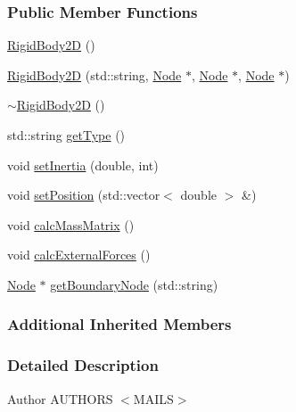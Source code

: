 \subsubsection*{Public Member Functions}
\begin{DoxyCompactItemize}
\item 
\hyperlink{classmknix_1_1_rigid_body2_d_a4689e5f861400337980478a2d8845834}{Rigid\-Body2\-D} ()
\item 
\hyperlink{classmknix_1_1_rigid_body2_d_ae8506521fc62c80097857eccaffaa1db}{Rigid\-Body2\-D} (std\-::string, \hyperlink{classmknix_1_1_node}{Node} $\ast$, \hyperlink{classmknix_1_1_node}{Node} $\ast$, \hyperlink{classmknix_1_1_node}{Node} $\ast$)
\item 
\hyperlink{classmknix_1_1_rigid_body2_d_a38d39e70ab2af08776a426fec5dc8f36}{$\sim$\-Rigid\-Body2\-D} ()
\item 
std\-::string \hyperlink{classmknix_1_1_rigid_body2_d_a36d7142c5123c4055c019109fb6169dc}{get\-Type} ()
\item 
void \hyperlink{classmknix_1_1_rigid_body2_d_a82c95b95d891532a73ec8dedc281aec4}{set\-Inertia} (double, int)
\item 
void \hyperlink{classmknix_1_1_rigid_body2_d_a485001c8c9639f1be3afebd185b3b921}{set\-Position} (std\-::vector$<$ double $>$ \&)
\item 
void \hyperlink{classmknix_1_1_rigid_body2_d_a9ee8593743364a723107d307c12d8ad1}{calc\-Mass\-Matrix} ()
\item 
void \hyperlink{classmknix_1_1_rigid_body2_d_a2d1b7d48c98c3e0ef63dc2c975637793}{calc\-External\-Forces} ()
\item 
\hyperlink{classmknix_1_1_node}{Node} $\ast$ \hyperlink{classmknix_1_1_rigid_body2_d_ab9ec8413811820b9f9b915df86b8372b}{get\-Boundary\-Node} (std\-::string)
\end{DoxyCompactItemize}
\subsubsection*{Additional Inherited Members}


\subsubsection{Detailed Description}
\begin{DoxyAuthor}{Author}
A\-U\-T\-H\-O\-R\-S $<$\-M\-A\-I\-L\-S$>$ 
\end{DoxyAuthor}


